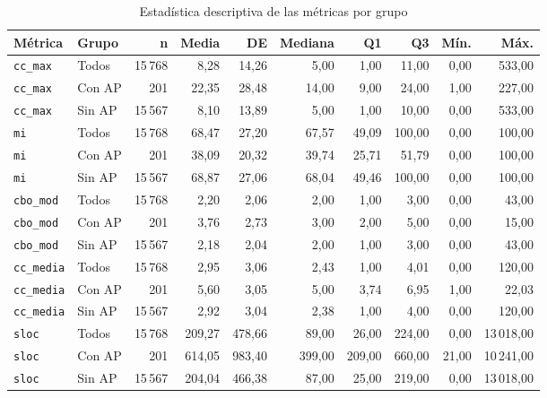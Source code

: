 \begin{table}[t]
\centering
\footnotesize
\setlength{\tabcolsep}{5pt}
\caption{Estadística descriptiva de las métricas por grupo}
\label{tab:descriptivos}
\begin{tabularx}{\textwidth}{@{}X l r r r r r r r r@{}}
\toprule
\textbf{Métrica} & \textbf{Grupo} & \textbf{n} & \textbf{Media} & \textbf{DE} & \textbf{Mediana} & \textbf{Q1} & \textbf{Q3} & \textbf{Mín.} & \textbf{Máx.} \\
\midrule
\texttt{cc\_max} & Todos & 15\,768 & 8,28 & 14,26 & 5,00 & 1,00 & 11,00 & 0,00 & 533,00 \\
\texttt{cc\_max} & Con AP & 201 & 22,35 & 28,48 & 14,00 & 9,00 & 24,00 & 1,00 & 227,00 \\
\texttt{cc\_max} & Sin AP & 15\,567 & 8,10 & 13,89 & 5,00 & 1,00 & 10,00 & 0,00 & 533,00 \\
\midrule
\texttt{mi} & Todos & 15\,768 & 68,47 & 27,20 & 67,57 & 49,09 & 100,00 & 0,00 & 100,00 \\
\texttt{mi} & Con AP & 201 & 38,09 & 20,32 & 39,74 & 25,71 & 51,79 & 0,00 & 100,00 \\
\texttt{mi} & Sin AP & 15\,567 & 68,87 & 27,06 & 68,04 & 49,46 & 100,00 & 0,00 & 100,00 \\
\midrule
\texttt{cbo\_mod} & Todos & 15\,768 & 2,20 & 2,06 & 2,00 & 1,00 & 3,00 & 0,00 & 43,00 \\
\texttt{cbo\_mod} & Con AP & 201 & 3,76 & 2,73 & 3,00 & 2,00 & 5,00 & 0,00 & 15,00 \\
\texttt{cbo\_mod} & Sin AP & 15\,567 & 2,18 & 2,04 & 2,00 & 1,00 & 3,00 & 0,00 & 43,00 \\
\midrule
\texttt{cc\_media} & Todos & 15\,768 & 2,95 & 3,06 & 2,43 & 1,00 & 4,01 & 0,00 & 120,00 \\
\texttt{cc\_media} & Con AP & 201 & 5,60 & 3,05 & 5,00 & 3,74 & 6,95 & 1,00 & 22,03 \\
\texttt{cc\_media} & Sin AP & 15\,567 & 2,92 & 3,04 & 2,38 & 1,00 & 4,00 & 0,00 & 120,00 \\
\midrule
\texttt{sloc} & Todos & 15\,768 & 209,27 & 478,66 & 89,00 & 26,00 & 224,00 & 0,00 & 13\,018,00 \\
\texttt{sloc} & Con AP & 201 & 614,05 & 983,40 & 399,00 & 209,00 & 660,00 & 21,00 & 10\,241,00 \\
\texttt{sloc} & Sin AP & 15\,567 & 204,04 & 466,38 & 87,00 & 25,00 & 219,00 & 0,00 & 13\,018,00 \\
\bottomrule
\end{tabularx}
\end{table}